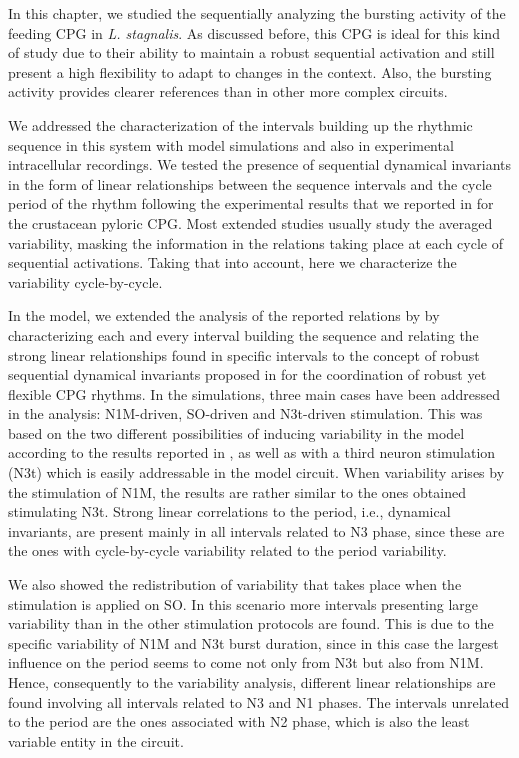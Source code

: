 In this chapter, we studied the sequentially analyzing the bursting activity of the feeding CPG in \textit{L. stagnalis}. As discussed before, this CPG is ideal for this kind of study due to their ability to maintain a robust sequential activation and still present a high flexibility to adapt to changes in the context. Also, the bursting activity provides clearer references than in other more complex circuits. 

We addressed the characterization of the intervals building up the rhythmic sequence in this system with model simulations and also in experimental intracellular recordings. We tested the presence of sequential dynamical invariants in the form of linear relationships between the sequence intervals and the cycle period of the rhythm following the experimental results that we reported in \textcite{elices_robust_2019} for the crustacean pyloric CPG. Most extended studies usually study the averaged variability, masking the information in the relations taking place at each cycle of sequential activations. Taking that into account, here we characterize the variability cycle-by-cycle. 

In the model, we extended the analysis of the reported relations by \textcite{elliott_temporal_1991} by characterizing each and every interval building the sequence and relating the strong linear relationships found in specific intervals to the concept of robust sequential dynamical invariants proposed in \textcite{elices_robust_2019} for the coordination of robust yet flexible CPG rhythms. In the simulations, three main cases have been addressed in the analysis: N1M-driven, SO-driven and N3t-driven stimulation. This was based on the two different possibilities of inducing variability in the model according to the results reported in \textcite{vavoulis_dynamic_2007}, as well as with a third neuron stimulation (N3t) which is easily addressable in the model circuit. When variability arises by the stimulation of N1M, the results are rather similar to the ones obtained stimulating N3t. Strong linear correlations to the period, i.e.,  dynamical invariants, are present mainly in all intervals related to N3 phase, since these are the ones with cycle-by-cycle variability related to the period variability.  

We also showed the redistribution of variability that takes place when the stimulation is applied on SO. In this scenario more intervals presenting large variability than in the other stimulation protocols are found. This is due to the specific variability of N1M and N3t burst duration, since in this case the largest influence on the period seems to come not only from N3t but also from N1M. Hence, consequently to the variability analysis, different linear relationships are found involving all intervals related to N3 and N1 phases. The intervals unrelated to the period are the ones associated with N2 phase, which is also the least variable entity in the circuit. 

